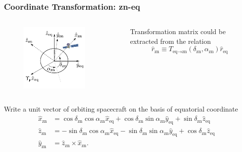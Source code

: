 \documentclass{beamer}
\begin{document}
\begin{frame}\frametitle{Coordinate Transformation: zn-eq}
  \begin{columns}
    \begin{figure}[h!]
      \centering
      \includegraphics[width=0.8\textwidth]{figure/fig_coordinate/coord_eq_sp_v3.pdf}
    \end{figure}

      Transformation matrix could be extracted from the relation
      \begin{equation*}
        \hat{r}_\text{zn} \equiv T_{\text{eq}\rightarrow\text{zn}} (\delta_\text{zn}, \alpha_\text{zn}) \hat{r}_\text{eq}
      \end{equation*}
  \end{columns}

Write a unit vector of orbiting spacecraft on the basis of equatorial coordinate
\begin{equation*}
  \begin{split}
  \hat{x}_\text{zn} &= \cos\delta_\text{zn}\cos\alpha_\text{zn}\hat{x}_\text{eq} + \cos\delta_\text{zn}\sin\alpha_\text{zn}\hat{y}_\text{eq} + \sin\delta_\text{zn}\hat{z}_\text{eq}\\
  \hat{z}_\text{zn} &= - \sin\delta_\text{zn}\cos\alpha_\text{zn}\hat{x}_\text{eq} - \sin\delta_\text{zn}\sin\alpha_\text{zn}\hat{y}_\text{eq} + \cos\delta_\text{zn}\hat{z}_\text{eq} \\
  \hat{y}_\text{zn} &= \hat{z}_\text{zn} \times \hat{x}_\text{zn}.
  \end{split}
  \label{eq:tf_eq_sp}
\end{equation*}
\end{frame}
\end{document}
